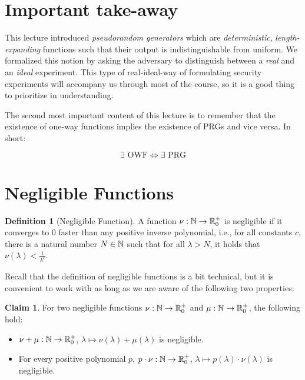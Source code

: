 \documentclass[a4paper,table,dvipsnames]{article}
\theoremstyle{definition}
\newtheorem{definition}{Definition}[section]
\newtheorem{claim}{Claim}
\begin{document}
\section{Important take-away}
This lecture introduced \emph{pseudorandom generators} which are \emph{deterministic},
\emph{length-expanding} functions such that their output is indistinguishable from uniform. We formalized this notion by
asking the adversary to distinguish between a \emph{real} and an \emph{ideal} experiment.
This type of real-ideal-way of formulating security experiments will accompany us through
most of the course, so it is a good thing to prioritize in understanding.

The second most important content of this lecture is to remember that the existence of
one-way functions implies the existence of PRGs and vice versa. In short:

\[\exists\text{ OWF} \Leftrightarrow\exists\text{ PRG}\]

\appendix
\section{Negligible Functions}\label{app:negligible}
\begin{definition}[Negligible Function]
A function $\nu:\mathbb{N}\rightarrow\mathbb{R}_0^+$ is negligible if it converges to $0$ faster than any positive inverse polynomial, i.e., for all constants $c$, there is a natural number $N\in\mathbb{N}$ such that for all $\lambda>N$, it holds that $\nu(\lambda)<\frac{1}{\lambda^c}$.
\end{definition}
Recall that the definition of negligible functions is a bit technical, but it is convenient to work with as long as we are aware of the following two properties:
\begin{claim}
For two negligible functions $\nu:\mathbb{N}\rightarrow\mathbb{R}_0^+$ and $\mu:\mathbb{N}\rightarrow\mathbb{R}_0^+$, the following hold:
\begin{itemize}
\item $\nu+\mu:\mathbb{N}\rightarrow\mathbb{R}_0^+$, $\lambda\mapsto\nu(\lambda)+\mu(\lambda)$ is negligible.
\item For every positive polynomial $p$, $p\cdot\nu:\mathbb{N}\rightarrow\mathbb{R}_0^+$, $\lambda\mapsto p(\lambda)\cdot\nu(\lambda)$ is negligible.
\end{itemize}
\end{claim}
\end{document}

